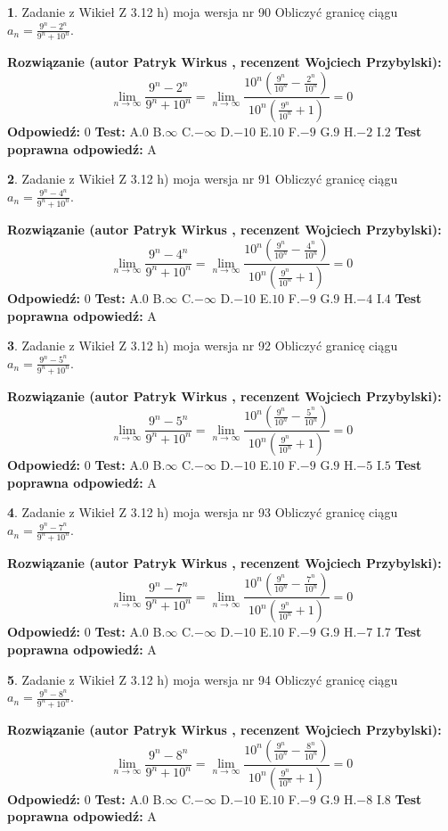 \documentclass[12pt, a4paper]{article}
\theoremstyle{definition} %
\newtheorem{zad}{}
\newcommand{\zadStart}[1]{\begin{zad}#1\newline}
\newcommand{\zadStop}{\end{zad}}
\newcommand{\rozwStart}[2]{\noindent \textbf{Rozwiązanie (autor #1 , recenzent #2): }\newline}
\newcommand{\rozwStop}{\newline}
\newcommand{\odpStart}{\noindent \textbf{Odpowiedź:}\newline}
\newcommand{\odpStop}{\newline}
\newcommand{\testStart}{\noindent \textbf{Test:}\newline}
\newcommand{\testStop}{\newline}
\newcommand{\kluczStart}{\noindent \textbf{Test poprawna odpowiedź:}\newline}
\newcommand{\kluczStop}{\newline}
\begin{document}
\zadStart{Zadanie z Wikieł Z 3.12 h) moja wersja nr 90}
Obliczyć granicę ciągu $a_{n}=\frac{9^{n} - 2^{n}}{9^{n} + 10^{n}}$.
\zadStop
\rozwStart{Patryk Wirkus}{Wojciech Przybylski}
$$\lim\limits_{n\to\infty}\frac{9^{n} - 2^{n}}{9^{n} + 10^{n}} = \lim\limits_{n\to\infty}\frac{10^{n}(\frac{9^{n}}{10^{n}} - \frac{2^{n}}{10^{n}})}{10^{n}(\frac{9^{n}}{10^{n}} + 1)} = 0$$
\rozwStop
\odpStart
$0$
\odpStop
\testStart
A.$0$
B.$\infty$
C.$-\infty$
D.$-10$
E.$10$
F.$-9$
G.$9$
H.$-2$
I.$2$
\testStop
\kluczStart
A
\kluczStop



\zadStart{Zadanie z Wikieł Z 3.12 h) moja wersja nr 91}
Obliczyć granicę ciągu $a_{n}=\frac{9^{n} - 4^{n}}{9^{n} + 10^{n}}$.
\zadStop
\rozwStart{Patryk Wirkus}{Wojciech Przybylski}
$$\lim\limits_{n\to\infty}\frac{9^{n} - 4^{n}}{9^{n} + 10^{n}} = \lim\limits_{n\to\infty}\frac{10^{n}(\frac{9^{n}}{10^{n}} - \frac{4^{n}}{10^{n}})}{10^{n}(\frac{9^{n}}{10^{n}} + 1)} = 0$$
\rozwStop
\odpStart
$0$
\odpStop
\testStart
A.$0$
B.$\infty$
C.$-\infty$
D.$-10$
E.$10$
F.$-9$
G.$9$
H.$-4$
I.$4$
\testStop
\kluczStart
A
\kluczStop



\zadStart{Zadanie z Wikieł Z 3.12 h) moja wersja nr 92}
Obliczyć granicę ciągu $a_{n}=\frac{9^{n} - 5^{n}}{9^{n} + 10^{n}}$.
\zadStop
\rozwStart{Patryk Wirkus}{Wojciech Przybylski}
$$\lim\limits_{n\to\infty}\frac{9^{n} - 5^{n}}{9^{n} + 10^{n}} = \lim\limits_{n\to\infty}\frac{10^{n}(\frac{9^{n}}{10^{n}} - \frac{5^{n}}{10^{n}})}{10^{n}(\frac{9^{n}}{10^{n}} + 1)} = 0$$
\rozwStop
\odpStart
$0$
\odpStop
\testStart
A.$0$
B.$\infty$
C.$-\infty$
D.$-10$
E.$10$
F.$-9$
G.$9$
H.$-5$
I.$5$
\testStop
\kluczStart
A
\kluczStop



\zadStart{Zadanie z Wikieł Z 3.12 h) moja wersja nr 93}
Obliczyć granicę ciągu $a_{n}=\frac{9^{n} - 7^{n}}{9^{n} + 10^{n}}$.
\zadStop
\rozwStart{Patryk Wirkus}{Wojciech Przybylski}
$$\lim\limits_{n\to\infty}\frac{9^{n} - 7^{n}}{9^{n} + 10^{n}} = \lim\limits_{n\to\infty}\frac{10^{n}(\frac{9^{n}}{10^{n}} - \frac{7^{n}}{10^{n}})}{10^{n}(\frac{9^{n}}{10^{n}} + 1)} = 0$$
\rozwStop
\odpStart
$0$
\odpStop
\testStart
A.$0$
B.$\infty$
C.$-\infty$
D.$-10$
E.$10$
F.$-9$
G.$9$
H.$-7$
I.$7$
\testStop
\kluczStart
A
\kluczStop



\zadStart{Zadanie z Wikieł Z 3.12 h) moja wersja nr 94}
Obliczyć granicę ciągu $a_{n}=\frac{9^{n} - 8^{n}}{9^{n} + 10^{n}}$.
\zadStop
\rozwStart{Patryk Wirkus}{Wojciech Przybylski}
$$\lim\limits_{n\to\infty}\frac{9^{n} - 8^{n}}{9^{n} + 10^{n}} = \lim\limits_{n\to\infty}\frac{10^{n}(\frac{9^{n}}{10^{n}} - \frac{8^{n}}{10^{n}})}{10^{n}(\frac{9^{n}}{10^{n}} + 1)} = 0$$
\rozwStop
\odpStart
$0$
\odpStop
\testStart
A.$0$
B.$\infty$
C.$-\infty$
D.$-10$
E.$10$
F.$-9$
G.$9$
H.$-8$
I.$8$
\testStop
\kluczStart
A
\kluczStop
\end{document}

